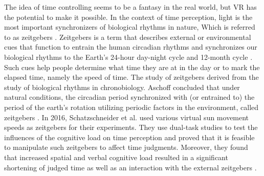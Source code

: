 \documentclass[sigconf]{acmart}
\begin{document}
The idea of time controlling seems to be a fantasy in the real world, but VR has the potential to make it possible. In the context of time perception, light is the most important synchronizers of biological rhythms in nature, Which is referred to as zeitgebers \cite{aschoff1965circadian, roenneberg2007human}. Zeitgebers is a term that describes external or environmental cues that function to entrain the human circadian rhythms and synchronizes our biological rhythms to the Earth's 24-hour day-night cycle and 12-month cycle \cite{aschoff1965circadian,pittendrigh1981circadian}. Such cues help people determine what time they are at in the day or to mark the elapsed time, namely the speed of time. The study of zeitgebers derived from the study of biological rhythms in chronobiology. Aschoff concluded that under natural conditions, the circadian period synchronized with (or entrained to) the period of the earth's rotation utilizing periodic factors in the environment, called zeitgebers \cite{aschoff1965circadian}. In 2016, Schatzschneider et al. used various virtual sun movement speeds as zeitgebers for their experiments. They use dual-task studies to test the influences of the cognitive load on time perception and proved that it is feasible to manipulate such zeitgebers to affect time judgments. Moreover, they found that increased spatial and verbal cognitive load resulted in a significant shortening of judged time as well as an interaction with the external zeitgebers \cite{schatzschneider2016turned}. 

\end{document}
